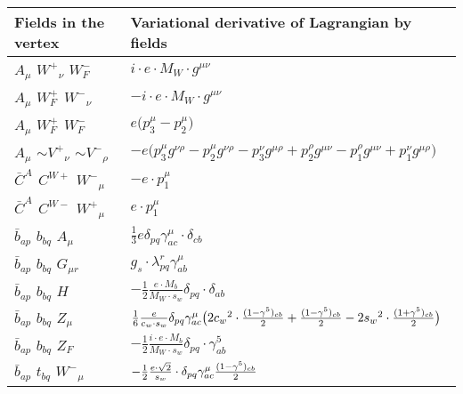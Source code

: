 \begin{center}
\begin{tabular}{|l|l|} \hline
Fields in the vertex & Variational derivative of Lagrangian by fields \\ \hline
${A}_{\mu }$ \phantom{-} $W^+{}_{\nu }$ \phantom{-} $W^-_F{}_{}$ \phantom{-}  &
	$ i \cdot e \cdot M_W\cdot g^{\mu \nu} $\\[2mm]
${A}_{\mu }$ \phantom{-} $W^+_F{}_{}$ \phantom{-} $W^-{}_{\nu }$ \phantom{-}  &
	$- i \cdot e \cdot M_W\cdot g^{\mu \nu} $\\[2mm]
${A}_{\mu }$ \phantom{-} $W^+_F{}_{}$ \phantom{-} $W^-_F{}_{}$ \phantom{-}  &
	$ e\big(p_3^\mu -p_2^\mu \big)$\\[2mm]
${A}_{\mu }$ \phantom{-} $\sim V^+{}_{\nu }$ \phantom{-} $\sim V^-{}_{\rho }$ \phantom{-}  &
	$- e\big(p_3^\mu g^{\nu \rho} -p_2^\mu g^{\nu \rho} -p_3^\nu g^{\mu \rho} +p_2^\rho g^{\mu \nu} -p_1^\rho g^{\mu \nu} +p_1^\nu g^{\mu \rho} \big)$\\[2mm]
$\bar{C}^A{}_{}$ \phantom{-} $C^{W+}{}_{}$ \phantom{-} $W^-{}_{\mu }$ \phantom{-}  &
	$- e\cdot p_1^\mu $\\[2mm]
$\bar{C}^A{}_{}$ \phantom{-} $C^{W-}{}_{}$ \phantom{-} $W^+{}_{\mu }$ \phantom{-}  &
	$ e\cdot p_1^\mu $\\[2mm]
$\bar{b}{}_{a p }$ \phantom{-} $b{}_{b q }$ \phantom{-} ${A}_{\mu }$ \phantom{-}  &
	$\frac{1}{3} e\delta_{p q} \gamma_{a c}^\mu \cdot \delta_{c b} $\\[2mm]
$\bar{b}{}_{a p }$ \phantom{-} $b{}_{b q }$ \phantom{-} ${G}_{\mu r }$ \phantom{-}  &
	$ g_s\cdot \lambda_{p q}^r \gamma_{a b}^\mu $\\[2mm]
$\bar{b}{}_{a p }$ \phantom{-} $b{}_{b q }$ \phantom{-} ${H}_{}$ \phantom{-}  &
	$-\frac{1}{2}\frac{ e \cdot M_b}{ M_W \cdot s_w}\delta_{p q} \cdot \delta_{a b} $\\[2mm]
$\bar{b}{}_{a p }$ \phantom{-} $b{}_{b q }$ \phantom{-} ${Z}_{\mu }$ \phantom{-}  &
	$\frac{1}{6}\frac{ e}{ c_w \cdot s_w}\delta_{p q} \gamma_{a c}^\mu \big(2 c_w{}^2 \cdot {(1-\gamma^5)_{c b}\over 2} +{(1-\gamma^5)_{c b}\over 2} -2 s_w{}^2 \cdot {(1+\gamma^5)_{c b}\over 2} \big)$\\[2mm]
$\bar{b}{}_{a p }$ \phantom{-} $b{}_{b q }$ \phantom{-} $Z_F{}_{}$ \phantom{-}  &
	$-\frac{1}{2}\frac{ i \cdot e \cdot M_b}{ M_W \cdot s_w}\delta_{p q} \cdot \gamma_{a b}^5 $\\[2mm]
$\bar{b}{}_{a p }$ \phantom{-} $t{}_{b q }$ \phantom{-} $W^-{}_{\mu }$ \phantom{-}  &
	$-\frac{1}{2}\frac{ e \cdot\sqrt{2}}{ s_w}\cdot \delta_{p q} \gamma_{a c}^\mu {(1-\gamma^5)_{c b}\over 2} $\\[2mm]

\end{tabular}
\end{center}
